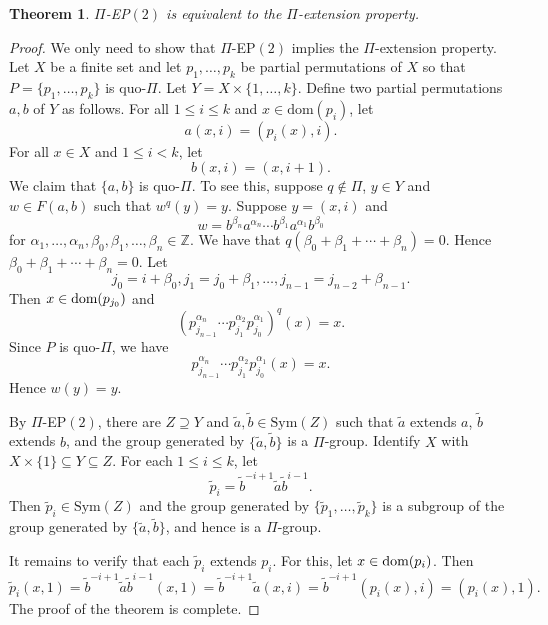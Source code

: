 \documentclass[11pt]{amsart}
\newtheorem{theorem}{Theorem}[section]
\theoremstyle{definition}
\newcommand{\dom}{{\mbox{\rm dom}}}
\theoremstyle{definition}
\numberwithin{equation}{section}
\begin{document}
\begin{theorem}\label{thm:EP2} $\Pi$-{\rm EP}$(2)$ is equivalent to the $\Pi$-extension property.
\end{theorem}
\begin{proof} We only need to show that $\Pi$-EP$(2)$ implies the $\Pi$-extension property. Let $X$ be a finite set and let $p_1,\dots, p_k$ be partial permutations of $X$ so that $P=\{p_1,\dots, p_k\}$ is quo-$\Pi$. Let $Y=X\times\{1,\dots, k\}$. Define two partial permutations $a, b$ of $Y$ as follows. For all $1\leq i\leq k$ and $x\in \mbox{dom}(p_i)$, let
$$ a(x, i)=(p_i(x), i). $$
For all $x\in X$ and $1\leq i<k$, let
$$ b(x,i)=(x,i+1). $$
We claim that $\{a, b\}$ is quo-$\Pi$. To see this, suppose $q\not\in \Pi$, $y\in Y$ and $w\in F(a,b)$ such that $w^q(y)=y$. Suppose $y=(x,i)$ and 
$$ w=b^{\beta_n}a^{\alpha_n}\cdots b^{\beta_1}a^{\alpha_1}b^{\beta_0} $$
for $\alpha_1,\dots, \alpha_n, \beta_0, \beta_1,\dots, \beta_n\in \mathbb{Z}$. We have that $q(\beta_0+\beta_1+\cdots+\beta_n)=0$. Hence $\beta_0+\beta_1+\cdots+\beta_n=0$.  Let 
$$j_0=i+\beta_0, j_1=j_0+\beta_1, \dots, j_{n-1}=j_{n-2}+\beta_{n-1}. $$ Then $x\in\dom(p_{j_0})$ and
$$ (p_{j_{n-1}}^{\alpha_n}\cdots p_{j_1}^{\alpha_2}p_{j_0}^{\alpha_1})^q(x)=x. $$
Since $P$ is quo-$\Pi$, we have
$$ p_{j_{n-1}}^{\alpha_n}\cdots p_{j_1}^{\alpha_2}p_{j_0}^{\alpha_1}(x)=x. $$
Hence $w(y)=y$. 

By $\Pi$-EP$(2)$, there are $Z\supseteq Y$ and $\tilde{a}, \tilde{b}\in \mbox{Sym}(Z)$ such that $\tilde{a}$ extends $a$,  $\tilde{b}$ extends $b$, and the group generated by $\{\tilde{a}, \tilde{b}\}$ is a $\Pi$-group. Identify $X$ with $X\times \{1\}\subseteq Y\subseteq Z$. For each $1\leq i\leq k$, let
$$ \tilde{p}_i=\tilde{b}^{-i+1}\tilde{a}\tilde{b}^{i-1}. $$
Then $\tilde{p}_i\in \mbox{Sym}(Z)$ and the group generated by $\{\tilde{p}_1, \dots, \tilde{p}_k\}$ is a subgroup of the group generated by $\{\tilde{a}, \tilde{b}\}$, and hence is a $\Pi$-group.

It remains to verify that each $\tilde{p}_i$ extends $p_i$. For this, let $x\in \dom(p_i)$. Then
$$ \tilde{p}_i(x, 1)=\tilde{b}^{-i+1}\tilde{a}\tilde{b}^{i-1}(x, 1)=\tilde{b}^{-i+1}\tilde{a}(x, i)=\tilde{b}^{-i+1}(p_i(x), i)=(p_i(x), 1). $$
The proof of the theorem is complete.
\end{proof}
\end{document}

